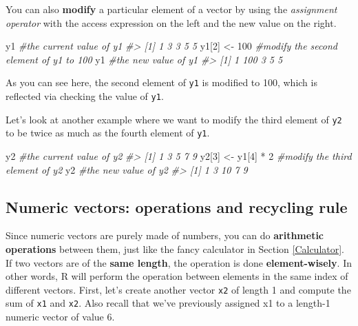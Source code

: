 \documentclass[
]{book}
\newenvironment{Shaded}{\begin{snugshade}}{\end{snugshade}}
\newcommand{\CommentTok}[1]{\textcolor[rgb]{0.56,0.35,0.01}{\textit{#1}}}
\newcommand{\DecValTok}[1]{\textcolor[rgb]{0.00,0.00,0.81}{#1}}
\newcommand{\NormalTok}[1]{#1}
\newcommand{\OtherTok}[1]{\textcolor[rgb]{0.56,0.35,0.01}{#1}}
\newcommand{\SpecialCharTok}[1]{\textcolor[rgb]{0.00,0.00,0.00}{#1}}
\begin{document}
You can also \textbf{modify} a particular element of a vector by using the \emph{assignment operator} with the access expression on the left and the new value on the right.

\begin{Shaded}
\begin{Highlighting}[]
\NormalTok{y1               }\CommentTok{\#the current value of y1}
\CommentTok{\#\textgreater{} [1] 1 3 3 5 5}
\NormalTok{y1[}\DecValTok{2}\NormalTok{] }\OtherTok{\textless{}{-}} \DecValTok{100}     \CommentTok{\#modify the second element of y1 to 100}
\NormalTok{y1               }\CommentTok{\#the new value of y1}
\CommentTok{\#\textgreater{} [1]   1 100   3   5   5}
\end{Highlighting}
\end{Shaded}

As you can see here, the second element of \texttt{y1} is modified to 100, which is reflected via checking the value of \texttt{y1}.

Let's look at another example where we want to modify the third element of \texttt{y2} to be twice as much as the fourth element of \texttt{y1}.

\begin{Shaded}
\begin{Highlighting}[]
\NormalTok{y2                     }\CommentTok{\#the current value of y2}
\CommentTok{\#\textgreater{} [1] 1 3 5 7 9}
\NormalTok{y2[}\DecValTok{3}\NormalTok{] }\OtherTok{\textless{}{-}}\NormalTok{ y1[}\DecValTok{4}\NormalTok{] }\SpecialCharTok{*} \DecValTok{2}     \CommentTok{\#modify the third element of y2}
\NormalTok{y2                     }\CommentTok{\#the new value of y2}
\CommentTok{\#\textgreater{} [1]  1  3 10  7  9}
\end{Highlighting}
\end{Shaded}

\hypertarget{numeric-vectors-operations-and-recycling-rule}{%
\subsection{Numeric vectors: operations and recycling rule}\label{numeric-vectors-operations-and-recycling-rule}}

Since numeric vectors are purely made of numbers, you can do \textbf{arithmetic operations} between them, just like the fancy calculator in Section \ref{Calculator}. If two vectors are of the \textbf{same length}, the operation is done \textbf{element-wisely}. In other words, R will perform the operation between elements in the same index of different vectors. First, let's create another vector \texttt{x2} of length 1 and compute the sum of \texttt{x1} and \texttt{x2}. Also recall that we've previously assigned x1 to a length-1 numeric vector of value 6.
\end{document}
